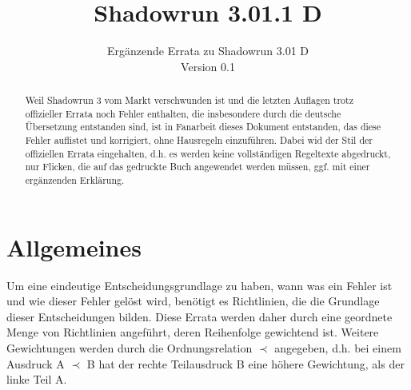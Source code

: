 \documentclass[a4paper]{scrartcl}
\title{Shadowrun 3.01.1 D}
\subtitle{Ergänzende Errata zu Shadowrun 3.01 D\\Version 0.1}
\author{\small\projekturl}
\begin{document}
\maketitle

\begin{abstract}
Weil Shadowrun 3 vom Markt verschwunden ist und die letzten Auflagen trotz offizieller Errata noch Fehler enthalten, die insbesondere durch die deutsche Übersetzung entstanden sind, ist in Fanarbeit dieses Dokument entstanden, das diese Fehler auflistet und korrigiert, ohne Hausregeln einzuführen. Dabei wid der Stil der offiziellen Errata eingehalten, d.h. es werden keine vollständigen Regeltexte abgedruckt, nur Flicken, die auf das gedruckte Buch angewendet werden müssen, ggf. mit einer ergänzenden Erklärung.
\end{abstract}

\tableofcontents

\section{Allgemeines}
Um eine eindeutige Entscheidungsgrundlage zu haben, wann was ein Fehler ist und wie dieser Fehler gelöst wird, benötigt es Richtlinien, die die Grundlage dieser Entscheidungen bilden.
Diese Errata werden daher durch eine geordnete Menge von Richtlinien angeführt, deren Reihenfolge gewichtend ist. Weitere Gewichtungen werden durch die Ordnungsrelation $\prec$ angegeben, d.h. bei einem Ausdruck \glqq A $\prec$ B\grqq{} hat der rechte Teilausdruck \glqq B\grqq{} eine höhere Gewichtung, als der linke Teil \glqq A\grqq.
\end{document}
